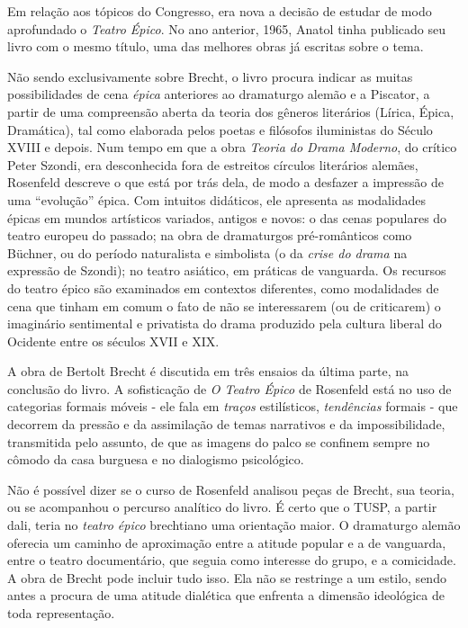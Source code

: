 Em relação aos tópicos do Congresso, era nova a decisão de estudar de
modo aprofundado o \textit{Teatro Épico}. No ano anterior, 1965, Anatol
tinha publicado seu livro com o mesmo título, uma das melhores obras já
escritas sobre o tema.

Não sendo exclusivamente sobre Brecht, o livro procura indicar as muitas
possibilidades de cena \textit{épica} anteriores ao dramaturgo alemão e a
Piscator, a partir de uma compreensão aberta da teoria dos gêneros
literários (Lírica, Épica, Dramática), tal como elaborada pelos poetas e
filósofos iluministas do Século XVIII e depois. Num tempo em que a obra
\textit{Teoria do Drama Moderno}, do crítico Peter Szondi, era desconhecida
fora de estreitos círculos literários alemães, Rosenfeld descreve o que
está por trás dela, de modo a desfazer a impressão de uma “evolução”
épica. Com intuitos didáticos, ele apresenta as modalidades épicas em
mundos artísticos variados, antigos e novos: o das cenas populares do
teatro europeu do passado; na obra de dramaturgos pré-românticos como
Büchner, ou do período naturalista e simbolista (o da \textit{crise do
drama} na expressão de Szondi); no teatro asiático, em práticas de
vanguarda. Os recursos do teatro épico são examinados em contextos
diferentes, como modalidades de cena que tinham em comum o fato de não
se interessarem (ou de criticarem) o imaginário sentimental e privatista
do drama produzido pela cultura liberal do Ocidente entre os séculos
XVII e XIX.

A obra de Bertolt Brecht é discutida em três ensaios da última parte, na
conclusão do livro. A sofisticação de \textit{O Teatro Épico} de Rosenfeld
está no uso de categorias formais móveis - ele fala em \textit{traços}
estilísticos, \textit{tendências} formais - que decorrem da pressão e da
assimilação de temas narrativos e da impossibilidade, transmitida pelo
assunto, de que as imagens do palco se confinem sempre no cômodo da casa
burguesa e no dialogismo psicológico.

Não é possível dizer se o curso de Rosenfeld analisou peças de Brecht,
sua teoria, ou se acompanhou o percurso analítico do livro. É certo que
o TUSP, a partir dali, teria no \textit{teatro épico} brechtiano uma
orientação maior. O dramaturgo alemão oferecia um caminho de aproximação
entre a atitude popular e a de vanguarda, entre o teatro documentário,
que seguia como interesse do grupo, e a comicidade. A obra de Brecht
pode incluir tudo isso. Ela não se restringe a um estilo, sendo antes a
procura de uma atitude dialética que enfrenta a dimensão ideológica de
toda representação.

